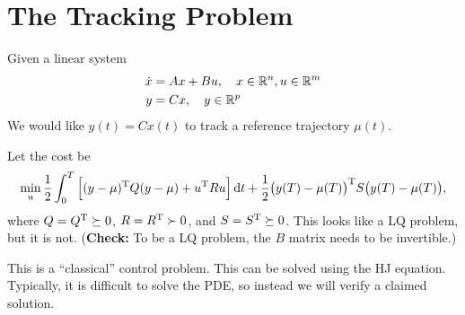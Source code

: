 \section{The Tracking Problem}
Given a linear system
\begin{align}
  \dot x &= Ax + Bu, \quad x\in\mathbb{R}^n,u\in\mathbb{R}^m \\
  y &= Cx, \quad y\in\mathbb{R}^p
\end{align}
We would like $y(t)=Cx(t)$ to track a reference trajectory $\mu(t)$.
\begin{center}
\end{center}
Let the cost be
\begin{gather}
  \min_u \frac12 \int_0^T \Big[ (y-\mu)^\text{T} Q (y-\mu) + u^\text{T} Ru \Big]\mathop{}\!\mathrm{d} t + \frac12 \big(y(T)-\mu(T)\big)^\text{T} S \big(y(T)-\mu(T)\big),
\end{gather}
where $Q=Q^\text{T} \succeq 0$, $R=R^\text{T} \succ 0$, and $S=S^\text{T} \succeq 0$. This looks like a LQ problem, but it is not. (\textbf{Check:} To be a LQ problem, the $B$ matrix needs to be invertible.)

This is a ``classical'' control problem. This can be solved using the HJ equation. Typically, it is difficult to solve the PDE, so instead we will verify a claimed solution.

